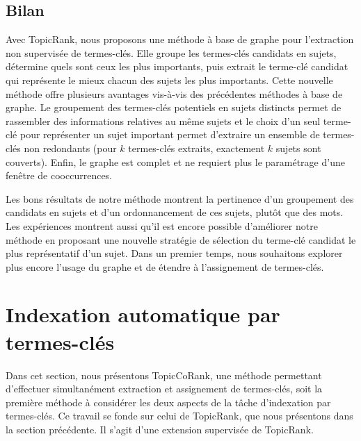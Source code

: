      \subsection{Bilan}
      \label{subsec:main-automatic_keyphrase_annotation-unsupervised_automatic_keyphrase_extraction-bilan}
        Avec TopicRank, nous proposons une méthode à base de graphe pour
        l'extraction non supervisée de termes-clés. Elle groupe les termes-clés
        candidats en sujets, détermine quels sont ceux les plus importants, puis
        extrait le terme-clé candidat qui représente le mieux chacun des sujets
        les plus importants. Cette nouvelle méthode offre plusieurs avantages
        vis-à-vis des précédentes méthodes à base de graphe. Le groupement des
        termes-clés potentiels en sujets distincts permet de rassembler des
        informations relatives au même sujets et le choix d'un seul terme-clé
        pour représenter un sujet important permet d'extraire un ensemble de
        termes-clés non redondants (pour $k$ termes-clés extraits, exactement
        $k$ sujets sont couverts). Enfin, le graphe est complet et ne requiert
        plus le paramétrage d'une fenêtre de cooccurrences.

        Les bons résultats de notre méthode montrent la pertinence d'un
        groupement des candidats en sujets et d'un ordonnancement de ces sujets,
        plutôt que des mots. Les expériences montrent aussi qu'il est encore
        possible d'améliorer notre méthode en proposant une nouvelle stratégie
        de sélection du terme-clé candidat le plus représentatif d'un sujet.
        Dans un premier temps, nous souhaitons explorer plus encore l'usage du
        graphe et de étendre à l'assignement de termes-clés.


  \section{Indexation automatique par termes-clés}
  \label{sec:main-automatic_keyphrase_annotation-supervised_automatic_keyphrase_extraction}
    Dans cet section, nous présentons TopicCoRank, une méthode permettant
    d'effectuer simultanément extraction et assignement de termes-clés, soit la
    première méthode à considérer les deux aspects de la tâche d'indexation par
    termes-clés. Ce travail se fonde sur celui de TopicRank, que nous présentons
    dans la section précédente. Il s'agit d'une extension supervisée de
    TopicRank.

